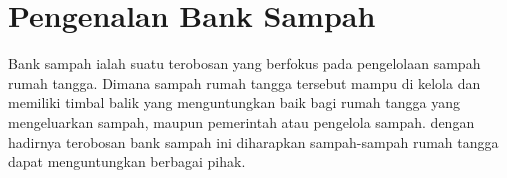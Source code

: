 \section{Pengenalan Bank Sampah}
Bank sampah ialah suatu terobosan yang berfokus pada pengelolaan sampah rumah tangga. Dimana sampah rumah tangga tersebut mampu di kelola dan memiliki timbal balik yang menguntungkan baik bagi rumah tangga yang mengeluarkan sampah, maupun pemerintah atau pengelola sampah. dengan hadirnya terobosan bank sampah ini diharapkan sampah-sampah rumah tangga dapat menguntungkan berbagai pihak. 